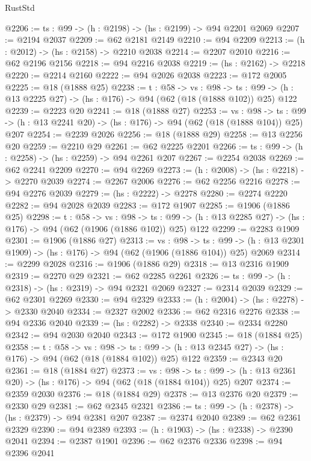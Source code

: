 \begin{lexlean}{RustStd}
\begin{coremodule}
{\begin{coremodule}
{{{{{{@2206 := {ts : @99} -> (h : @2198) -> (hs : @2199) -> @94 @2201 @2069
@2207 := @2194 @2037
@2209 := @62 @2181 @2149
@2210 := @94 @2209
@2213 := (h : @2012) -> (hs : @2158) -> @2210 @2038
@2214 := @2207 @2010
@2216 := @62 @2196 @2156
@2218 := @94 @2216 @2038
@2219 := (hs : @2162) -> @2218
@2220 := @2214 @2160
@2222 := @94 @2026 @2038
@2223 := @172 @2005
@2225 := @18 (@1888 @25)
@2238 := {t : @58} ->
  {vs : @98} ->
  {ts : @99} -> (h : @13 @2225 @27) -> (hs : @176) -> @94 (@62 (@18 (@1888 @102)) @25) @122
@2239 := @2223 @20
@2241 := @18 (@1888 @27)
@2253 := {vs : @98} ->
  {ts : @99} -> (h : @13 @2241 @20) -> (hs : @176) -> @94 (@62 (@18 (@1888 @104)) @25) @207
@2254 := @2239 @2026
@2256 := @18 (@1888 @29)
@2258 := @13 @2256 @20
@2259 := @2210 @29
@2261 := @62 @2225 @2201
@2266 := {ts : @99} -> (h : @2258) -> (hs : @2259) -> @94 @2261 @207
@2267 := @2254 @2038
@2269 := @62 @2241 @2209
@2270 := @94 @2269
@2273 := (h : @2008) -> (hs : @2218) -> @2270 @2039
@2274 := @2267 @2006
@2276 := @62 @2256 @2216
@2278 := @94 @2276 @2039
@2279 := (hs : @2222) -> @2278
@2280 := @2274 @2220
@2282 := @94 @2028 @2039
@2283 := @172 @1907
@2285 := @1906 (@1886 @25)
@2298 := {t : @58} ->
  {vs : @98} ->
  {ts : @99} -> (h : @13 @2285 @27) -> (hs : @176) -> @94 (@62 (@1906 (@1886 @102)) @25) @122
@2299 := @2283 @1909
@2301 := @1906 (@1886 @27)
@2313 := {vs : @98} ->
  {ts : @99} -> (h : @13 @2301 @1909) -> (hs : @176) -> @94 (@62 (@1906 (@1886 @104)) @25) @2069
@2314 := @2299 @2028
@2316 := @1906 (@1886 @29)
@2318 := @13 @2316 @1909
@2319 := @2270 @29
@2321 := @62 @2285 @2261
@2326 := {ts : @99} -> (h : @2318) -> (hs : @2319) -> @94 @2321 @2069
@2327 := @2314 @2039
@2329 := @62 @2301 @2269
@2330 := @94 @2329
@2333 := (h : @2004) -> (hs : @2278) -> @2330 @2040
@2334 := @2327 @2002
@2336 := @62 @2316 @2276
@2338 := @94 @2336 @2040
@2339 := (hs : @2282) -> @2338
@2340 := @2334 @2280
@2342 := @94 @2030 @2040
@2343 := @172 @1900
@2345 := @18 (@1884 @25)
@2358 := {t : @58} ->
  {vs : @98} ->
  {ts : @99} -> (h : @13 @2345 @27) -> (hs : @176) -> @94 (@62 (@18 (@1884 @102)) @25) @122
@2359 := @2343 @20
@2361 := @18 (@1884 @27)
@2373 := {vs : @98} ->
  {ts : @99} -> (h : @13 @2361 @20) -> (hs : @176) -> @94 (@62 (@18 (@1884 @104)) @25) @207
@2374 := @2359 @2030
@2376 := @18 (@1884 @29)
@2378 := @13 @2376 @20
@2379 := @2330 @29
@2381 := @62 @2345 @2321
@2386 := {ts : @99} -> (h : @2378) -> (hs : @2379) -> @94 @2381 @207
@2387 := @2374 @2040
@2389 := @62 @2361 @2329
@2390 := @94 @2389
@2393 := (h : @1903) -> (hs : @2338) -> @2390 @2041
@2394 := @2387 @1901
@2396 := @62 @2376 @2336
@2398 := @94 @2396 @2041
}}}}}}
\end{coremodule}}
\end{coremodule}
\end{lexlean}
